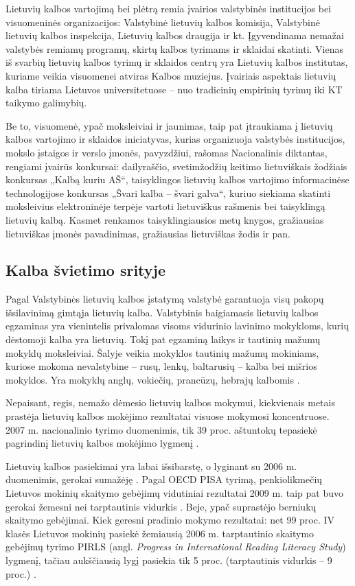 \documentclass[]{../metanetpaper}
\begin{document}
\begin{multicols}{2}
    Lietuvių kalbos vartojimą bei plėtrą remia įvairios valstybinės institucijos bei visuomeninės organizacijos: Valstybinė lietuvių kalbos komisija, Valstybinė lietuvių kalbos inspekcija, Lietuvių kalbos draugija ir kt. Įgyvendinama nemažai valstybės remiamų programų, skirtų kalbos tyrimams ir sklaidai skatinti.
Vienas iš svarbių lietuvių kalbos tyrimų ir sklaidos centrų yra Lietuvių kalbos institutas, kuriame veikia visuomenei atviras Kalbos muziejus. Įvairiais aspektais lietuvių kalba tiriama Lietuvos universitetuose – nuo tradicinių empirinių tyrimų iki KT taikymo galimybių.

Be to, visuomenė, ypač moksleiviai ir jaunimas, taip pat įtraukiama į lietuvių kalbos vartojimo ir sklaidos iniciatyvas, kurias organizuoja valstybės institucijos, mokslo įstaigos ir verslo įmonės, pavyzdžiui, rašomas Nacionalinis diktantas, rengiami įvairūs konkursai: dailyraščio, svetimžodžių keitimo lietuviškais žodžiais konkursas „Kalbą kuriu AŠ“, taisyklingos lietuvių kalbos vartojimo informacinėse technologijose konkursas „Švari kalba – švari galva“, kuriuo siekiama skatinti moksleivius elektroninėje terpėje vartoti lietuviškus rašmenis bei taisyklingą lietuvių kalbą. Kasmet renkamos taisyklingiausios metų knygos, gražiausias lietuviškas įmonės pavadinimas, gražiausias lietuviškas žodis ir pan.

\subsection{Kalba švietimo srityje}

Pagal Valstybinės lietuvių kalbos įstatymą valstybė garantuoja visų pakopų išsilavinimą gimtąja lietuvių kalba. Valstybinis baigiamasis lietuvių kalbos egzaminas yra vienintelis privalomas visoms vidurinio lavinimo mokykloms, kurių dėstomoji kalba yra lietuvių. Tokį pat egzaminą laikys ir tautinių mažumų mokyklų moksleiviai. Šalyje veikia mokyklos tautinių mažumų mokiniams, kuriose mokoma nevalstybine – rusų, lenkų, baltarusių – kalba bei mišrios mokyklos. Yra mokyklų anglų, vokiečių, prancūzų, hebrajų kalbomis \cite{smm1}.  

    Nepaisant, regis, nemažo dėmesio lietuvių kalbos mokymui, kiekvienais metais prastėja lietuvių kalbos mokėjimo rezultatai visuose mokymosi koncentruose. 2007 m. nacionalinio tyrimo duomenimis, tik 39 proc. aštuntokų tepasiekė pagrindinį lietuvių kalbos mokėjimo lygmenį \cite{smm1}.   

    Lietuvių kalbos pasiekimai yra labai išsibarstę, o lyginant su 2006 m. duomenimis, gerokai sumažėję \cite{smm2}.  Pagal OECD PISA tyrimą, penkiolikmečių Lietuvos mokinių skaitymo gebėjimų vidutiniai rezultatai 2009 m. taip pat buvo gerokai žemesni nei tarptautinis vidurkis \cite{nec1}.  Beje, ypač suprastėjo berniukų skaitymo gebėjimai. Kiek geresni pradinio mokymo rezultatai: net 99 proc. IV klasės Lietuvos mokinių pasiekė žemiausią 2006 m. tarptautinio skaitymo gebėjimų tyrimo PIRLS (angl. \textit{Progress in International Reading Literacy Study}) lygmenį, tačiau aukščiausią lygį pasiekia tik 5 proc. (tarptautinis vidurkis – 9 proc.) \cite{nec2}.   


\end{multicols}
\end{document}
